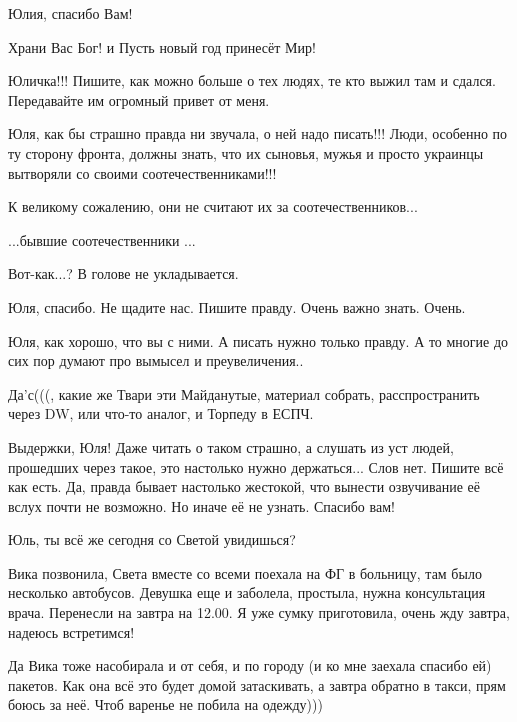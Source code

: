 \begin{itemize}
Юлия, спасибо Вам!

Храни Вас Бог! и Пусть новый год принесёт Мир!

Юличка!!! Пишите, как можно больше о тех людях, те кто выжил там и сдался. Передавайте им огромный привет от меня.


Юля, как бы страшно правда ни звучала, о ней надо писать!!! Люди, особенно по
ту сторону фронта, должны знать, что их сыновья, мужья и просто украинцы
вытворяли со своими соотечественниками!!!

\begin{itemize} %
К великому сожалению, они не считают их за соотечественников...

...бывшие соотечественники ...
\end{itemize} %

Вот-как...? В голове не укладывается.

Юля, спасибо. Не щадите нас. Пишите правду. Очень важно знать. Очень.

Юля, как хорошо, что вы с ними. А писать нужно только правду. А то многие до сих пор думают про вымысел и преувеличения..

Да'с(((, какие же Твари эти Майданутые, материал собрать, расспространить через DW, или что-то аналог, и Торпеду в ЕСПЧ.


Выдержки, Юля! Даже читать о таком страшно, а слушать из уст людей, прошедших
через такое, это настолько нужно держаться... Слов нет. Пишите всё как есть.
Да, правда бывает настолько жестокой, что вынести озвучивание её вслух почти не
возможно. Но иначе её не узнать. Спасибо вам!

Юль, ты всё же сегодня со Светой увидишься?

\begin{itemize} %

Вика позвонила, Света вместе со всеми поехала на ФГ в больницу, там было
несколько автобусов. Девушка еще и заболела, простыла, нужна консультация
врача. Перенесли на завтра на 12.00. Я уже сумку приготовила, очень жду завтра,
надеюсь встретимся!

Да Вика тоже насобирала и от себя, и по городу (и ко мне заехала спасибо ей) пакетов. Как она всё это будет домой затаскивать, а завтра обратно в такси, прям боюсь за неё. Чтоб варенье не побила на одежду)))


\end{itemize}
\end{itemize}
